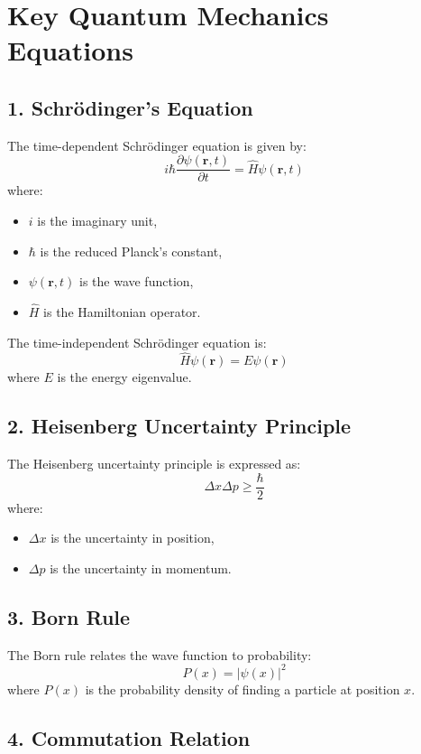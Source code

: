 \documentclass{article}
\begin{document}
\section*{Key Quantum Mechanics Equations}

\subsection*{1. Schrödinger's Equation}

The time-dependent Schrödinger equation is given by:
\[
i \hbar \frac{\partial \psi(\mathbf{r}, t)}{\partial t} = \hat{H} \psi(\mathbf{r}, t)
\]
where:
\begin{itemize}
    \item \( i \) is the imaginary unit,
    \item \( \hbar \) is the reduced Planck's constant,
    \item \( \psi(\mathbf{r}, t) \) is the wave function,
    \item \( \hat{H} \) is the Hamiltonian operator.
\end{itemize}

The time-independent Schrödinger equation is:
\[
\hat{H} \psi(\mathbf{r}) = E \psi(\mathbf{r})
\]
where \( E \) is the energy eigenvalue.

\subsection*{2. Heisenberg Uncertainty Principle}

The Heisenberg uncertainty principle is expressed as:
\[
\Delta x \Delta p \geq \frac{\hbar}{2}
\]
where:
\begin{itemize}
    \item \( \Delta x \) is the uncertainty in position,
    \item \( \Delta p \) is the uncertainty in momentum.
\end{itemize}

\subsection*{3. Born Rule}

The Born rule relates the wave function to probability:
\[
P(x) = |\psi(x)|^2
\]
where \( P(x) \) is the probability density of finding a particle at position \( x \).

\subsection*{4. Commutation Relation}
\end{document}
